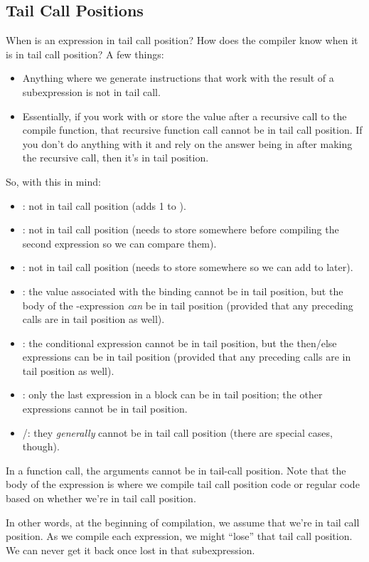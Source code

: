 \subsection{Tail Call Positions}
When is an expression in tail call position? How does the compiler know when it is in tail call position? A few things: 
\begin{itemize}
    \item Anything where we generate instructions that work with the result of a subexpression is not in tail call.  
    \item Essentially, if you work with  or store the value after a recursive call to the compile function, that recursive function call cannot be in tail call position. If you don't do anything with it and rely on the answer being in  after making the recursive call, then it's in tail position.
\end{itemize}
So, with this in mind: 
\begin{itemize}
    \item {}: not in tail call position (adds 1 to ). 
    \item {}: not in tail call position (needs to store  somewhere before compiling the second expression so we can compare them).
    \item {}: not in tail call position (needs to store  somewhere so we can add to  later).
    \item {}: the value associated with the binding cannot be in tail position, but the body of the -expression \emph{can} be in tail position (provided that any preceding calls are in tail position as well).
    \item {}: the conditional expression cannot be in tail position, but the then/else expressions can be in tail position (provided that any preceding calls are in tail position as well).
    \item {}: only the last expression in a block can be in tail position; the other expressions cannot be in tail position. 
    \item {}/: they \emph{generally} cannot be in tail call position (there are special cases, though).
\end{itemize}
In a function call, the arguments cannot be in tail-call position. Note that the body of the expression is where we compile tail call position code or regular code based on whether we're in tail call position. 

\bigskip 

In other words, at the beginning of compilation, we assume that we're in tail call position. As we compile each expression, we might ``lose'' that tail call position. We can never get it back once lost in that subexpression.